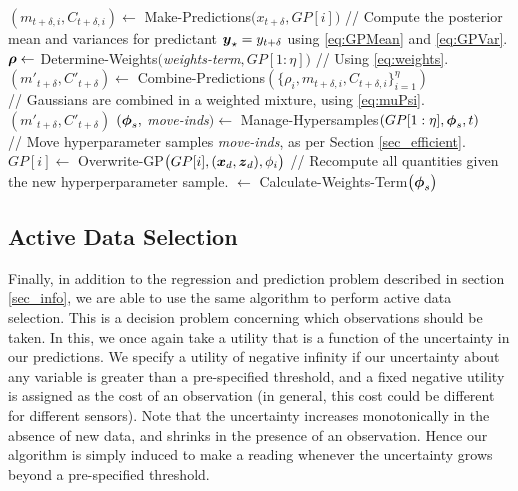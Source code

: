 \documentclass{acmtrans2m}
\newcommand{\cmmnt}{// }
\begin{document}
\begin{algorithm}[htb!]
\begin{algorithmic}[1]
\STATE $(m_{t+\delta,i},C_{t+\delta,i}) \leftarrow$ {\sc Make-Predictions}$\bigl(x_{t+\delta},GP[i]\bigr)$ \cmmnt Compute the posterior mean and variances for predictant $\boldsymbol{y}_\star = y_{t+\delta}$ using \eqref{eq:GPMean} and \eqref{eq:GPVar}.
    \ENDFOR
    \STATE $\boldsymbol{\rho} \leftarrow$ {\sc Determine-Weights}$(${\it weights-term}$,GP[1:\eta])$ \cmmnt Using \eqref{eq:weights}.
    \STATE $(m'_{t+\delta},C'_{t+\delta}) \leftarrow$ {\sc Combine-Predictions}$(\{\rho_i,m_{t+\delta,i},C_{t+\delta,i}\}_{i=1}^{\eta})$ \\\cmmnt Gaussians are combined in a weighted mixture, using \eqref{eq:muPsi}.
     $(m'_{t+\delta},C'_{t+\delta})$
\IF{{\sc Is-Time-To-Move}(t) \cmmnt Infrequently true} 
    \STATE $(\boldsymbol{\phi}_s, $ {\it move-inds}$) \leftarrow$ {\sc Manage-Hypersamples}$( 
GP[1:\eta], \boldsymbol{\phi}_s, t)$\\ \cmmnt Move hyperparameter samples {\it move-inds}, as per Section \ref{sec_efficient}.
\STATE $GP[i] \leftarrow$ {\sc Overwrite-GP}$\bigl(GP[i], (\boldsymbol{x}_d, \boldsymbol{z}_d), \phi_i\bigr)$ \cmmnt Recompute all quantities given the new hyperperparameter sample.
\ENDFOR
{} $ \leftarrow$ {\sc Calculate-Weights-Term}$\bigl(\boldsymbol{\phi}_s\bigr)$
\ENDIF
    \ENDFOR
  \end{algorithmic}
  \label{alg:track}
\end{algorithm}



\subsection{Active Data Selection}

\noindent Finally, in addition to the regression and prediction problem described in section \ref{sec_info}, we are able to use the same algorithm to perform active data selection. This is a decision problem concerning which observations should be taken. In this, we once again take a utility that is a function of the uncertainty in our predictions. We specify a utility of negative infinity if our uncertainty about any variable is greater than a pre-specified threshold, and a fixed negative utility is assigned as the cost of an observation (in general, this cost could be different for different sensors). Note that the uncertainty increases monotonically in the absence of new data, and shrinks in the presence of an observation. Hence our algorithm is simply induced to make a reading whenever the uncertainty grows beyond a pre-specified threshold. 
\end{document}

